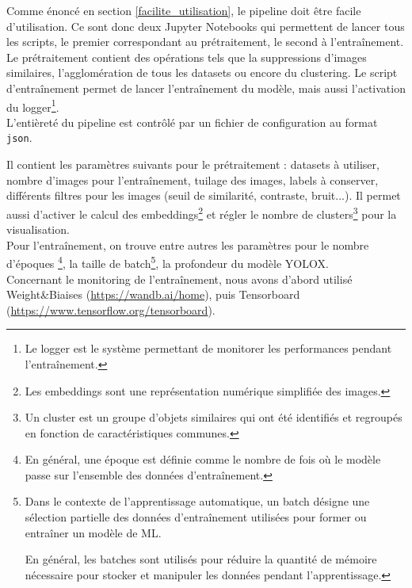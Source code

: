 Comme énoncé en section \ref{facilite_utilisation}, le pipeline doit être facile d'utilisation.
Ce sont donc deux Jupyter Notebooks qui permettent de lancer tous les scripts, le premier correspondant
au prétraitement, le second à l'entraînement. Le prétraitement contient des opérations tels que
la suppressions d'images similaires, l'agglomération de tous les datasets ou encore du clustering.
Le script d'entraînement permet de lancer l'entraînement du modèle, mais aussi l'activation du
logger\footnote{Le logger est le système permettant de monitorer les performances pendant l'entraînement.}.\\


L'entièreté du pipeline est contrôlé par un fichier de configuration au format \texttt{json}.

Il contient les paramètres suivants pour le prétraitement : datasets à utiliser, nombre d'images pour
l'entraînement, tuilage des images, labels à conserver, différents filtres pour les images (seuil de
similarité, contraste, bruit...). Il permet aussi d'activer le calcul des embeddings\footnote{
Les embeddings sont une représentation numérique simplifiée des images.}
et régler le nombre de clusters\footnote{Un cluster est un groupe d'objets similaires 
qui ont été identifiés et regroupés en fonction de caractéristiques communes.} pour la visualisation.\\

Pour l'entraînement, on trouve entre autres les paramètres pour le nombre d'époques
\footnote{En général, une époque est définie comme le nombre de fois où le modèle passe sur l'ensemble des données d'entraînement.}, la taille de batch\footnote{Dans le contexte de l'apprentissage automatique, un batch désigne une sélection partielle des données d'entraînement utilisées pour former ou entraîner un modèle de ML.

En général, les batches sont utilisés pour réduire la quantité de mémoire nécessaire pour stocker et manipuler les données pendant l'apprentissage.},
la profondeur du modèle YOLOX.\\

Concernant le monitoring de l'entraînement, nous avons d'abord utilisé Weight\&Biaises
(\url{https://wandb.ai/home}), puis Tensorboard (\url{https://www.tensorflow.org/tensorboard}). \\

